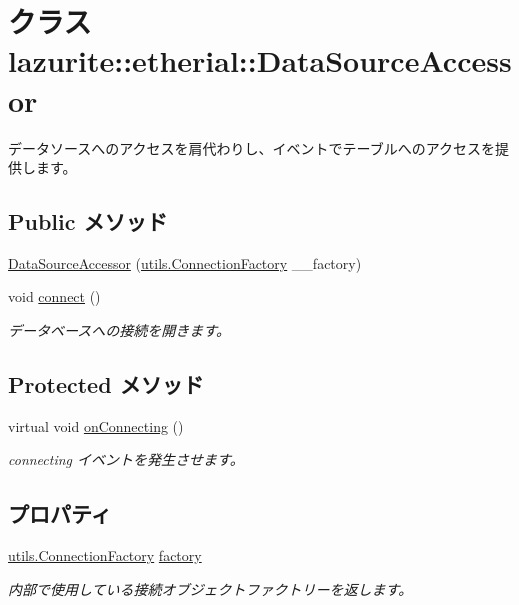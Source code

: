 \hypertarget{classlazurite_1_1etherial_1_1_data_source_accessor}{
\section{クラス lazurite::etherial::DataSourceAccessor}
\label{classlazurite_1_1etherial_1_1_data_source_accessor}
}


データソースへのアクセスを肩代わりし、イベントでテーブルへのアクセスを提供します。  
\subsection*{Public メソッド}
\begin{DoxyCompactItemize}
\item 
\hyperlink{classlazurite_1_1etherial_1_1_data_source_accessor_aca529d0f5b23223c93c536897318b727}{DataSourceAccessor} (\hyperlink{classlazurite_1_1etherial_1_1utils_1_1_connection_factory}{utils.ConnectionFactory} \_\-\_\-factory)
\item 
void \hyperlink{classlazurite_1_1etherial_1_1_data_source_accessor_ab685463c590d00380580edb7e62b5078}{connect} ()
\begin{DoxyCompactList}\small\item\em データベースへの接続を開きます。 \item\end{DoxyCompactList}\end{DoxyCompactItemize}
\subsection*{Protected メソッド}
\begin{DoxyCompactItemize}
\item 
virtual void \hyperlink{classlazurite_1_1etherial_1_1_data_source_accessor_a794da7d3f1232feea4dc00ff25ebe93a}{onConnecting} ()
\begin{DoxyCompactList}\small\item\em connecting イベントを発生させます。 \item\end{DoxyCompactList}\end{DoxyCompactItemize}
\subsection*{プロパティ}
\begin{DoxyCompactItemize}
\item 
\hyperlink{classlazurite_1_1etherial_1_1utils_1_1_connection_factory}{utils.ConnectionFactory} \hyperlink{classlazurite_1_1etherial_1_1_data_source_accessor_a4832023d76c7928dda2f4a10f2e533cb}{factory}
\begin{DoxyCompactList}\small\item\em 内部で使用している接続オブジェクトファクトリーを返します。 \item\end{DoxyCompactList}\end{DoxyCompactItemize}
